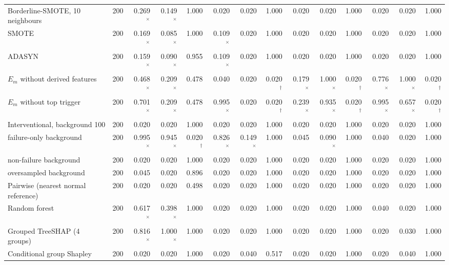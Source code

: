 \begin{tabular}{@{}lrrrrrrrrrrrrr@{}}
Borderline-SMOTE, 10 neighbours & 200 & 0.269$^{\times}$ & 0.149$^{\times}$ & 1.000 & 0.020 & 0.020 & 1.000 & 0.020 & 0.020 & 1.000 & 0.020 & 0.020 & 1.000 \\
SMOTE & 200 & 0.169$^{\times}$ & 0.085$^{\times}$ & 1.000 & 0.109$^{\times}$ & 0.020 & 1.000 & 0.020 & 0.020 & 1.000 & 0.020 & 0.020 & 1.000 \\
ADASYN & 200 & 0.159$^{\times}$ & 0.090$^{\times}$ & 0.955 & 0.109$^{\times}$ & 0.020 & 1.000 & 0.020 & 0.020 & 1.000 & 0.020 & 0.020 & 1.000 \\
$E_m$ without derived features & 200 & 0.468$^{\times}$ & 0.209$^{\times}$ & 0.478 & 0.040 & 0.020 & 0.020$^{\dagger}$ & 0.179$^{\times}$ & 1.000$^{\times}$ & 0.020$^{\dagger}$ & 0.776$^{\times}$ & 1.000$^{\times}$ & 0.020$^{\dagger}$ \\
$E_m$ without top trigger & 200 & 0.701$^{\times}$ & 0.209$^{\times}$ & 0.478 & 0.995$^{\times}$ & 0.020 & 0.020$^{\dagger}$ & 0.239$^{\times}$ & 0.935$^{\times}$ & 0.020$^{\dagger}$ & 0.995$^{\times}$ & 0.657$^{\times}$ & 0.020$^{\dagger}$ \\
\addlinespace
Interventional, background 100 & 200 & 0.020 & 0.020 & 1.000 & 0.020 & 0.020 & 1.000 & 0.020 & 0.020 & 1.000 & 0.020 & 0.020 & 1.000 \\
\quad failure-only background & 200 & 0.995$^{\times}$ & 0.945$^{\times}$ & 0.020$^{\dagger}$ & 0.826$^{\times}$ & 0.149$^{\times}$ & 1.000 & 0.045 & 0.090$^{\times}$ & 1.000 & 0.040 & 0.020 & 1.000 \\
\quad non-failure background & 200 & 0.020 & 0.020 & 1.000 & 0.020 & 0.020 & 1.000 & 0.020 & 0.020 & 1.000 & 0.020 & 0.020 & 1.000 \\
\quad oversampled background & 200 & 0.045 & 0.020 & 0.896 & 0.020 & 0.020 & 1.000 & 0.020 & 0.020 & 1.000 & 0.020 & 0.020 & 1.000 \\
Pairwise (nearest normal reference) & 200 & 0.020 & 0.020 & 0.498 & 0.020 & 0.020 & 1.000 & 0.020 & 0.020 & 1.000 & 0.020 & 0.020 & 1.000 \\
Random forest & 200 & 0.617$^{\times}$ & 0.398$^{\times}$ & 1.000 & 0.020 & 0.020 & 1.000 & 0.020 & 0.020 & 1.000 & 0.040 & 0.020 & 1.000 \\
Grouped TreeSHAP (4 groups) & 200 & 0.816$^{\times}$ & 1.000$^{\times}$ & 1.000 & 0.020 & 0.020 & 1.000 & 0.020 & 0.020 & 1.000 & 0.020 & 0.030 & 1.000 \\
Conditional group Shapley & 200 & 0.020 & 0.020 & 1.000 & 0.020 & 0.040 & 0.517 & 0.020 & 0.020 & 1.000 & 0.020 & 0.040 & 1.000 \\

\end{tabular}
